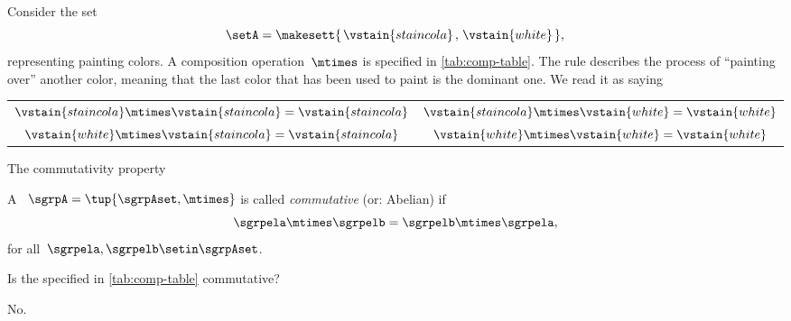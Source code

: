 \begin{example}
    Consider the set
    \begin{equation}
        \setA = \makesett{\hspace{0.05cm} \vstain{staincola}\hspace{0.05cm},\hspace{0.05cm} \vstain{white}\hspace{0.05cm}},
    \end{equation}
    representing painting colors.
    A composition operation~$\mtimes$ is specified in \cref{tab:comp-table}.
    The rule describes the process of ``painting over'' another color, meaning that the last color that has been used to paint is the dominant one.
    We read it as saying
    \begin{center}
        \setlength{\tabcolsep}{20pt}
        \begin{tabular}{cc}
            $\vstain{staincola} \mtimes \vstain{staincola} = \vstain{staincola}$ & $\vstain{staincola} \mtimes \vstain{white} = \vstain{white}$ \\
            $\vstain{white} \mtimes \vstain{staincola} = \vstain{staincola}$     & $\vstain{white} \mtimes \vstain{white} = \vstain{white}$
        \end{tabular}
    \end{center}
\end{example}

\begin{marginfigure}
    \centering
    \caption{The commutativity property}
    \label{fig:magma-diagram}
\end{marginfigure}

\begin{definition}
    \label{def:magma-commutativity}
    A ~$\sgrpA = \tup{\sgrpAset, \mtimes}$ is called \emph{commutative} (or: Abelian) if
    \begin{equation}
        \label{eq:semigroup-commutativity}
        \sgrpela \mtimes \sgrpelb = \sgrpelb \mtimes \sgrpela,
    \end{equation}
    for all~$\sgrpela, \sgrpelb \setin \sgrpAset$.
\end{definition}


\begin{exercise}
    Is the  specified in \cref{tab:comp-table} commutative?
\end{exercise}
\begin{solution}
    No.
\end{solution}

